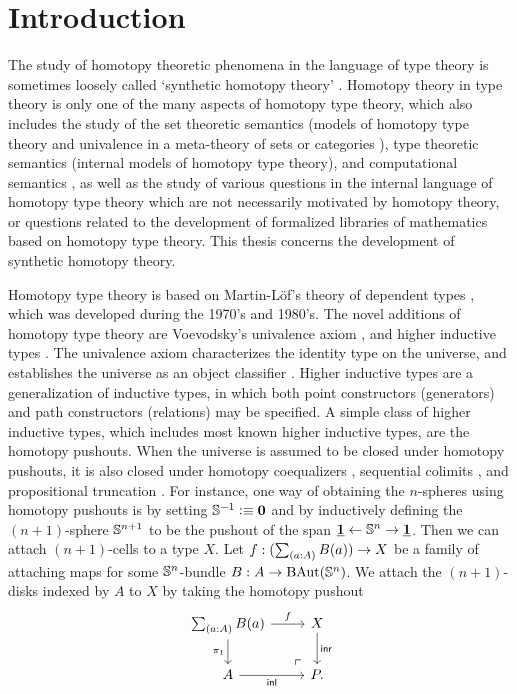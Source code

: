 \chapter{Introduction}
The study of homotopy theoretic phenomena in the language of type theory \cite{hottbook} is 
sometimes loosely called `synthetic homotopy theory' \cite{Brunerie16}. 
Homotopy theory in type theory \cite{Awodey12} is only one of the
many aspects of homotopy type theory, which also includes the study of the
set theoretic semantics (models of homotopy type theory and univalence in a
meta-theory of sets or categories \cite{Awodey14,AwodeyWarren,BezemCoquandHuber,KapulkinLeFanuLumsdaine,Shulman15,Voevodsky15}), type theoretic semantics (internal models of homotopy type
theory), and computational semantics \cite{AngiuliHarperWilson}, as well as the study of various questions
in the internal language of homotopy type theory which are not necessarily 
motivated by homotopy theory, or questions related to the development of
formalized libraries of mathematics based on homotopy type theory.
This thesis concerns the development of synthetic homotopy theory.

Homotopy type theory is based on Martin-L\"of's theory of dependent types \cite{MartinLof1984}, which
was developed during the 1970's and 1980's.
The novel additions of homotopy type theory are Voevodsky's univalence axiom \cite{Voevodsky06,Voevodsky10},
and higher inductive types \cite{Lumsdaine11Blog,Shulman11Blog,hottbook}. The univalence axiom characterizes the identity
type on the universe, and establishes the universe as an object classifier \cite{RijkeSpitters}.
Higher inductive types are a generalization of inductive types, in which both
point constructors (generators) and path constructors (relations) may be specified.
A simple class of higher inductive types, which includes most known higher inductive
types, are the homotopy pushouts. When the universe is assumed to be closed
under homotopy pushouts, it is also closed under homotopy coequalizers \cite{hottbook}, 
sequential colimits \cite{hottbook}, and propositional truncation \cite{vanDoorn2016}.
For instance, one way of obtaining the $n$-spheres \cite{Lumsdaine12Blog} using homotopy pushouts is by setting $\mathbb{S}^{-1}\vcentcolon\equiv\mathbf{0}$ and
by inductively defining the $(n+1)$-sphere $\mathbb{S}^{n+1}$ to be the pushout
of the span $\underline{\mathbf{1}} \leftarrow\mathbb{S}^{n}\rightarrow\underline{\mathbf{1}}$. 
Then we can attach $(n+1)$-cells to a type $X$.
Let $f:(\sm{a:A}B(a))\to X$ be a family of attaching maps
for some $\mathbb{S}^{n}$-bundle $B:A\to\mathrm{BAut}(\mathbb{S}^{n})$. We
attach the $(n+1)$-disks indexed by $A$ to $X$ by taking the homotopy pushout
\begin{equation*}
\begin{tikzcd}
\sm{a:A}B(a) \arrow[r,"f"] \arrow[d,swap,"\pi_1"]  & X \arrow[d,"\inr"] \\
A \arrow[r,swap,"\inl"] & P. \arrow[ul,phantom,very near start,"\ulcorner"]
\end{tikzcd}
\end{equation*}

